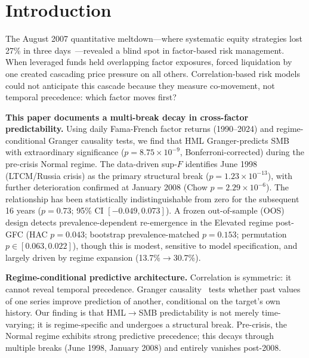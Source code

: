 \documentclass[sigconf,anonymous]{acmart}
\begin{document}

\maketitle

\section{Introduction}

The August 2007 quantitative meltdown---where systematic equity strategies
lost 27\% in three days~\cite{khandani2011quants}---revealed a blind spot
in factor-based risk management. When leveraged funds held overlapping factor
exposures, forced liquidation by one created cascading price pressure on all
others. Correlation-based risk models could not anticipate this cascade because
they measure co-movement, not temporal precedence: which factor moves first?

\textbf{This paper documents a multi-break decay in cross-factor predictability.}
Using daily Fama-French factor returns (1990--2024) and regime-conditional
Granger causality tests, we find that HML Granger-predicts SMB with extraordinary
significance ($p = 8.75 \times 10^{-9}$, Bonferroni-corrected) during the
pre-crisis Normal regime. The data-driven sup-$F$ identifies June 1998 (LTCM/Russia crisis)
as the primary structural break ($p = 1.23\times10^{-13}$), with further
deterioration confirmed at January 2008 (Chow $p = 2.29\times10^{-6}$).
The relationship has been statistically indistinguishable from zero
for the subsequent 16 years ($p = 0.73$; 95\% CI $[-0.049, 0.073]$).
A frozen out-of-sample (OOS) design detects prevalence-dependent re-emergence in
the Elevated regime post-GFC (HAC $p = 0.043$; bootstrap prevalence-matched
$p = 0.153$; permutation $p \in [0.063, 0.022]$), though this is modest,
sensitive to model specification, and largely driven by regime expansion
(13.7\%$\to$30.7\%).

\textbf{Regime-conditional predictive architecture.}
Correlation is symmetric: it cannot reveal temporal precedence. Granger
causality~\cite{granger1969investigating} tests whether past values of one
series improve prediction of another, conditional on the target's own history.
Our finding is that HML$\to$SMB predictability is not merely time-varying;
it is regime-specific and undergoes a structural break. Pre-crisis, the Normal
regime exhibits strong predictive precedence; this decays through multiple breaks
(June 1998, January 2008) and entirely vanishes post-2008.
\end{document}

